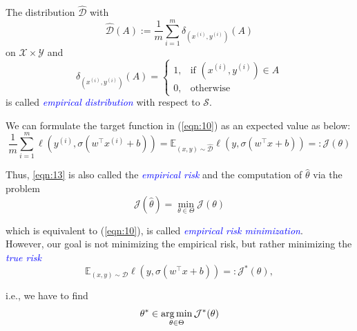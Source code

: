 \begin{definition}
The distribution $\hat{\mathcal{D}}$ with
\begin{equation}
    \hat{\mathcal{D}}(A) := \frac{1}{m}\sum_{i=1}^{m}\delta_{(x^{(i)}, y^{(i)})}(A)
    \label{eqn:11}
\end{equation}
on $\mathcal{X} \times \mathcal{Y}$ and
\begin{equation}
    \delta_{(x^{(i)}, y^{(i)})}(A) =
    \begin{cases} 
        1, & \text{if } (x^{(i)}, y^{(i)}) \in A \\
        0, & \text{otherwise}
    \end{cases}
    \label{eqn:12}
\end{equation}
is called \textcolor{blue}{\emph{empirical distribution}} with respect to $\mathcal{S}$.
\end{definition}

We can formulate the target function in (\ref{eqn:10}) as an expected value as below:
\begin{equation}
    \frac{1}{m} \sum_{i=1}^{m} \ell (y^{(i)}, \sigma(w^\top x^{(i)}+b)) = \mathbb{E}_{(x,y) \sim \hat{\mathcal{D}}}\ell (y, \sigma(w^\top x+b)) =: \mathcal{J}(\theta)
    \label{eqn:13}
\end{equation}

Thus, \ref{eqn:13} is also called the \textcolor{blue}{\emph{empirical risk}} and the computation of $\hat{\theta}$ via the problem
\begin{equation}
    \mathcal{J}(\hat{\theta}) = \min_{\theta \in \Theta} \mathcal{J}(\theta)
    \label{eqn:14}
\end{equation}

which is equivalent to (\ref{eqn:10}), is called \textcolor{blue}{\emph{empirical risk minimization}}.\\

However, our goal is not minimizing the empirical risk, but rather minimizing the \textcolor{blue}{\emph{true risk}}
\begin{equation}
    \mathbb{E}_{(x,y) \sim \mathcal{D}}\ell (y, \sigma(w^\top x+b)) =: \mathcal{J}^*(\theta),
    \label{eqn:15}
\end{equation}

i.e., we have to find
\begin{equation}
    \theta^* \in \operatorname*{arg\,min}_{\theta \in \Theta} \mathcal{J}^*(\theta)
    \label{eqn:16}
\end{equation}

